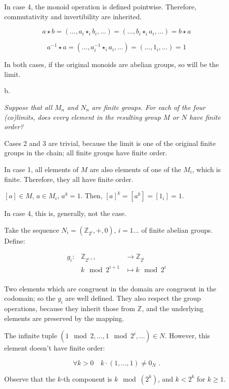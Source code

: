 \documentclass[a4paper,notitlepage]{article}
\begin{document}
\begin{enumerate}
\begin{enumerate}
         In case 4, the monoid operation is defined pointwise.
         Therefore, commutativity and invertibility are inherited.

         $$a \star b = (…, a_i \star_i b_i, …) = (…, b_i \star_i a_i, …) = b \star a$$
         
         $$a^{-1} \star a = (…, a_i^{-1} \star_i a_i, …) = (…, 1_i, …) = 1$$

         In both cases, if the original monoids are abelian groups, so
         will be the limit.

       \item[b.]

         {\em Suppose that all $M_n$ and $N_n$ are finite groups.
           For each of the four (co)limits, does every element in the
           resulting group $M$ or $N$ have finite order?}

         Cases 2 and 3 are trivial, because the limit is one of the
         original finite groups in the chain; all finite groups have
         finite order.

         In case 1, all elements of $M$ are also elements of one of the
         $M_i$, which is finite. Therefore, they all have finite order.

         $[a] \in M$, $a \in M_i$, $a^k = 1$. Then, $[a]^k = \left [ a^k \right ] = \left [ 1_i \right ] = 1$.

         In case 4, this is, generally, not the case.

         Take the sequence $N_i = (\mathbb{Z}_{2^{i}},+,0)$, $i = 1 … $ of finite abelian
         groups. Define:

         \begin{eqnarray*}
           g_i : & \mathbb{Z}_{2^{i+1}} & → \mathbb{Z}_{2^{i}} \\
                 & k \mod 2^{i+1}      & \mapsto k \mod 2^{i} \\
         \end{eqnarray*}

         Two elements which are congruent in the domain are congruent
         in the codomain; so the $g_i$ are well defined. They also respect
         the group operations, because they inherit those from $\mathbb{Z}$,
         and the underlying elements are preserved by the mapping.
         
         The infinite tuple $(1 \mod 2, …, 1 \mod 2^{i}, …) \in N$. However, this element
         doesn't have finite order:
         
         $$\forall k > 0 \quad k·(1, …, 1) \neq 0_N \text{ .}$$

         Observe that the $k$-th component is $k \mod (2^{k})$, and $k < 2^{k}$ for $k ≥ 1$.
         
         
     \end{enumerate}

\end{enumerate}
\end{document}
